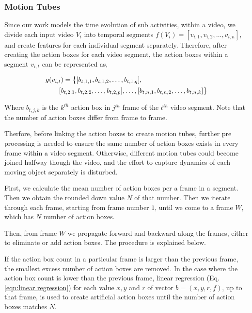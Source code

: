 \subsubsection{Motion Tubes}
Since our work models the time evolution of sub activities, within a video, we divide each input video $V_{i}$ into temporal segments $f(V_{i}) = [v_{i,1},
v_{i,2}, \dots, v_{i,n}]$,
and create features for each individual segment separately. Therefore, after creating the action boxes for each video segment,
the action boxes within a segment $v_{i,t}$ can be represented as,

\begin{equation}
\label{eqn:action box}
\begin{split}
\MoveEqLeft
 g(v_{i,t}) = \big\{[b_{t,1,1},b_{t,1,2},\dots,b_{t,1,q}],\\
 & [b_{t,2,1},b_{t,2,2},\dots,b_{t,2,p}],\dots,[b_{t,n,1},b_{t,n,2},\dots,b_{t,n,k}]\big\}
\end{split}
\end{equation}

Where $b_{t,j,k}$ is the $k^{th}$ action box in $j^{th}$ frame of the $t^{th}$ video segment. Note that the number of
action boxes differ from frame to frame.

Therfore, before linking the action boxes to create motion tubes, further pre processing is needed to ensure the same number of action
boxes exists in every frame within a video segment. Otherwise, different motion tubes could become joined halfway though the video, and the
effort to capture dynamics of each moving object separately is disturbed.

First, we calculate the mean number of action boxes per a frame in a segment. Then we obtain the rounded down value $N$ of that number.
Then we iterate through each frame, starting from frame number $1$, until we come to a frame $W$, which has $N$ number of action boxes.

Then, from frame $W$ we propagate forward and backward along the frames, either to eliminate or add action boxes. The procedure is explained
below.

If the action box count in a particular frame is larger than the previous frame, the smallest excess number of action boxes are removed.
In the case where the action box count is lower than the previous frame, linear regression (Eq. \ref{eqn:linear regression}) for each value $x,y$ and $r$ of vector $b = (x,y,r,f)$,
up to that frame, is used to create artificial action boxes until the number of action boxes matches $N$.

